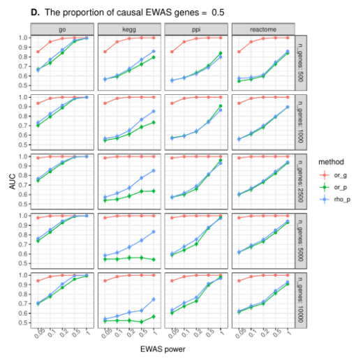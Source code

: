 \documentclass[11pt,twoside]{bristolthesis}
\begin{document}
\begin{center}\includegraphics[width=1\linewidth]{figure/06-ewas_gwas_comparison/method_test_gene_up_all/PEC_0.5} \end{center}
\end{document}
